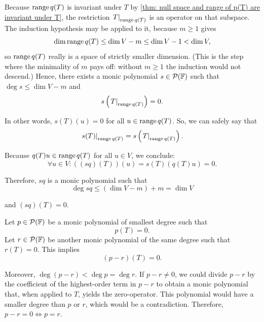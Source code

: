 \begin{prf}
  Because $\operatorname{range} q(T)$ is invariant under $T$ by \ref{thm: null space and range of p(T) are invariant under T}, the restriction $\left.T\right|_{\operatorname{range} q(T)}$ is an operator on that subspace. The induction hypothesis may be applied to it, because $m \geq 1$ gives
  \begin{equation}
    \dim \operatorname{range} q(T) \leq \dim V - m \leq \dim V - 1 < \dim V,
  \end{equation}
  so $\operatorname{range} q(T)$ really is a space of strictly smaller dimension. (This is the step where the minimality of $m$ pays off: without $m \geq 1$ the induction would not descend.)
  Hence, there exists a monic polynomial $s \in \mathcal{P} (\mathbb{F})$ such that $\deg s \leq \dim V - m$ and
  \begin{equation}
    s\left(\left.T\right|_{\operatorname{range} q(T)}\right)=0.
  \end{equation}

  In other words, $s(T)(u) = 0$ for all $u \in \operatorname{range} q(T)$. So, we can safely say that
  \begin{equation}
    \left.s(T)\right|_{\operatorname{range} q(T)}=s\left( \left.T\right|_{\operatorname{range} q(T)} \right ).
  \end{equation}

  Because $q(T)u \in \operatorname{range} q(T)$ for all $u \in V$, we conclude:
  \begin{equation}
     \forall u \in V: \left((sq)(T)\right)(u) = s(T) (q(T)u) = 0.
  \end{equation}


  Therefore, $sq$ is a monic polynomial such that
  \begin{equation}
    \deg sq \leq (\dim V -m ) + m = \dim V
  \end{equation}

  and $(sq)(T)=0$.

   Let $p\in \mathcal{P} (\mathbb{F})$ be a monic polynomial of smallest degree such that
  \begin{equation}
    p(T)=0.
  \end{equation} Let $r\in \mathcal{P} ( \mathbb{F})$ be another monic polynomial of the same degree such that $r(T)=0$. This implies
  \begin{equation}
    (p-r) (T) = 0.
  \end{equation}

  Moreover, $\deg (p-r) < \deg p = \deg r$. If $p-r \neq 0$, we could divide $p-r$ by the coefficient of the highest-order term in $p-r$ to obtain a monic polynomial that, when applied to $T$, yields the zero-operator. This polynomial would have a smaller degree than $p$ or $r$, which would be a contradiction. Therefore, $p-r=0 \iff p = r$.
\end{prf}

